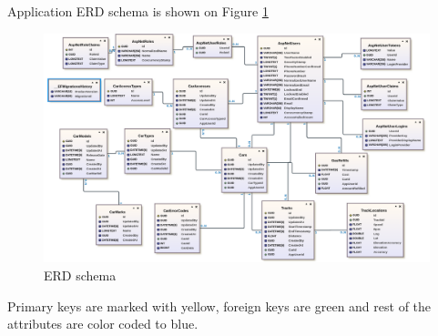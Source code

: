 Application ERD schema is shown on Figure
\ref{fig:erd-schema}

\begin{figure}[h]
    \includegraphics[width=\textwidth]{figures/erd_schema}
    \caption{ERD schema}
    \label{fig:erd-schema}
\end{figure}

Primary keys are marked with yellow, foreign keys are green and rest of the attributes are color coded to blue.